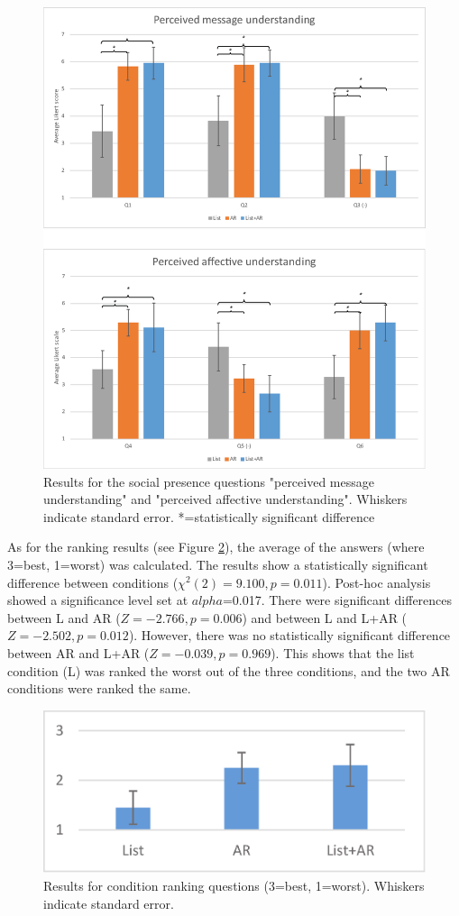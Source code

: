 \begin{figure}[htb]
  \centering
  \includegraphics[width=.8\linewidth]{images/61-video-mgia16/social-presence.eps}
  \caption{Results for the social presence questions "perceived message understanding" and "perceived affective understanding". Whiskers indicate standard error. *=statistically significant difference}
    \label{fig:mgia16:social_presence}
\end{figure}

As for the ranking results (see Figure \ref{fig:mgia16:ranking}), the average of the answers (where 3=best, 1=worst) was calculated. The results show a statistically significant difference between conditions ($\chi^2(2)=9.100, p=0.011$). Post-hoc analysis showed a significance level set at $alpha$=0.017. There were significant differences between L and AR ($Z=-2.766, p=0.006$) and between L and L+AR ($Z=-2.502, p=0.012$). However, there was no statistically significant difference between AR and L+AR ($Z=-0.039, p=0.969$). This shows that the list condition (L) was ranked the worst out of the three conditions, and the two AR conditions were ranked the same.

\begin{figure}[htb]
  \centering
  \includegraphics[width=.4\linewidth]{images/61-video-mgia16/ranking.eps}
  \caption{Results for condition ranking questions (3=best, 1=worst). Whiskers indicate standard error.}
    \label{fig:mgia16:ranking}
\end{figure}

